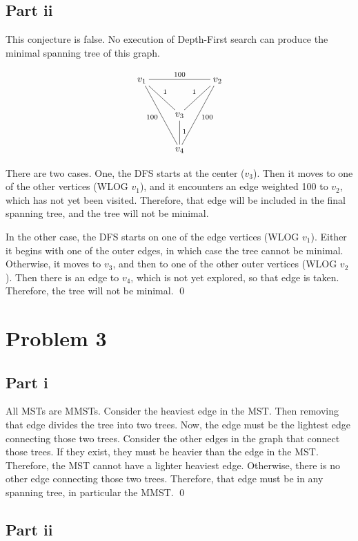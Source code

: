 \documentclass[twoside]{amsart}
\begin{document}
\subsection*{Part ii}
This conjecture is false. No execution of Depth-First search can
produce the minimal spanning tree of this graph.

\[\xymatrix{
  v_1 \ar@{-}[rr]^{100} \ar@{-}[ddr]_{100} \ar@{-}[dr]^1  & \txt{} & v_2 \ar@{-}[ddl]^{100}
  \ar@{-}[dl]_1    \\
  \txt{} & v_3 \ar@{-}[d]^1   & \txt{} \\
  \txt{} & v_4    & \txt{} 
}\]

There are two cases.  One, the DFS starts at the center ($v_3$).  Then it
moves to one of the other vertices (WLOG $v_1$), and it encounters an
edge weighted 100 to $v_2$, which has not yet been visited.
Therefore, that edge will be included in the final spanning tree, and
the tree will not be minimal.

In the other case, the DFS starts on one of the edge vertices (WLOG
$v_1$).  Either it begins with one of the outer edges, in which case
the tree cannot be minimal.  Otherwise, it moves to $v_3$, and
then to one of the other outer vertices (WLOG $v_2$).  Then there is
an edge to $v_4$, which is not yet explored, so that edge is taken.
Therefore, the tree will not be minimal. \qed

\section*{Problem 3}

\subsection*{Part i}

All MSTs are MMSTs.  Consider the heaviest edge in the MST.  Then
removing that edge divides the tree into two trees.  Now, the edge
must be the lightest edge connecting those two trees.  Consider the
other edges in the graph that connect those trees.  If they exist,
they must be heavier than the edge in the MST.  Therefore, the MST
cannot have a lighter heaviest edge.  Otherwise, there is no other
edge connecting those two trees.  Therefore, that edge must be in any
spanning tree, in particular the MMST.  \qed

\subsection*{Part ii}
\end{document}
